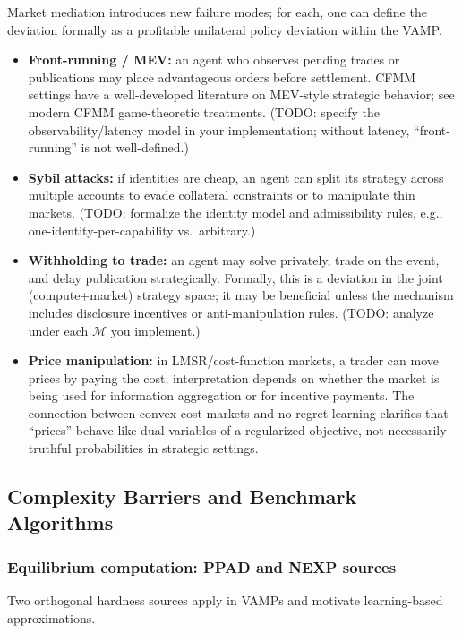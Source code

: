 Market mediation introduces new failure modes; for each, one can define the deviation formally as a profitable unilateral policy deviation within the VAMP.

\begin{itemize}
\item \textbf{Front-running / MEV:} an agent who observes pending trades or publications may place advantageous orders before settlement. CFMM settings have a well-developed literature on MEV-style strategic behavior; see modern CFMM game-theoretic treatments. (TODO: specify the observability/latency model in your implementation; without latency, ``front-running'' is not well-defined.)
\item \textbf{Sybil attacks:} if identities are cheap, an agent can split its strategy across multiple accounts to evade collateral constraints or to manipulate thin markets. (TODO: formalize the identity model and admissibility rules, e.g., one-identity-per-capability vs.\ arbitrary.)
\item \textbf{Withholding to trade:} an agent may solve privately, trade on the event, and delay publication strategically. Formally, this is a deviation in the joint (compute+market) strategy space; it may be beneficial unless the mechanism includes disclosure incentives or anti-manipulation rules. (TODO: analyze under each \(\mathcal{M}\) you implement.)
\item \textbf{Price manipulation:} in LMSR/cost-function markets, a trader can move prices by paying the cost; interpretation depends on whether the market is being used for information aggregation or for incentive payments. The connection between convex-cost markets and no-regret learning clarifies that ``prices'' behave like dual variables of a regularized objective, not necessarily truthful probabilities in strategic settings.
\end{itemize}

\subsection{Complexity Barriers and Benchmark Algorithms}

\subsubsection{Equilibrium computation: PPAD and NEXP sources}

Two orthogonal hardness sources apply in VAMPs and motivate learning-based approximations.

